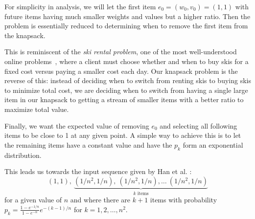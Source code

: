 For simplicity in analysis, we will let the first item $e_0=(w_0,v_0)=(1,1)$ with future items having much smaller weights and values but a higher ratio. Then the problem is essentially reduced to determining when to remove the first item from the knapsack.

This is reminiscent of the \emph{ski rental problem}, one of the most well-understood online problems~\cite{karlin}, where a client must choose whether and when to buy skis for a fixed cost versus paying a smaller cost each day. Our knapsack problem is the reverse of this: instead of deciding when to switch from renting skis to buying skis to minimize total cost, we are deciding when to switch from having a single large item in our knapsack to getting a stream of smaller items with a better ratio to maximize total value.

Finally, we want the expected value of removing $e_0$ and selecting all following items to be close to 1 at any given point. A simple way to achieve this is to let the remaining items have a constant value and have the $p_k$ form an exponential distribution.

This leads us towards the input sequence given by Han et al. \cite{han}:
\begin{equation}
	\label{eq:knapsack_dist}
	(1,1),\ \underbrace{(1/n^2,1/n),\ (1/n^2,1/n),\ldots\ (1/n^2,1/n)}_{k \text{ items}}
\end{equation}
for a given value of $n$ and where there are $k+1$ items with probability $p_k = \frac{1-e^{-1/n}}{1-e^{-n}} e^{-(k-1)/n}$ for $k=1,2,\ldots,n^2$.

